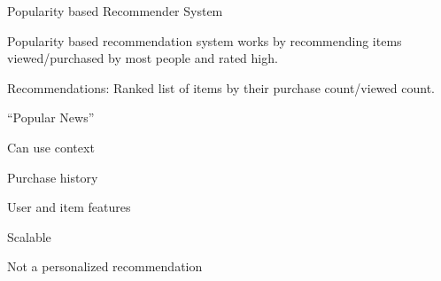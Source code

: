 Popularity based Recommender System
	\begin{bulletedlist}
		\item Popularity based recommendation system works by recommending items viewed/pur\-chased by most people and rated high.
		\item Recommendations: Ranked list of items by their purchase count/viewed count.
		\item``Popular News''
		\begin{bulletedlist}
			\item Can use context
			\item Purchase history
			\item User and item features
			\item Scalable
		\end{bulletedlist}
		\item Not a personalized recommendation
	\end{bulletedlist}

	\ 